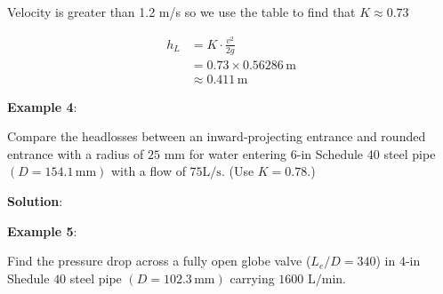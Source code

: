\documentclass[10pt, oneside]{amsart}
\begin{document}
\begin{multicols}{2}
{Velocity is greater than 1.2 m/s so we use the table to find that $K \approx 0.73 $

\begin{align*}
	h_L &= K\cdot\frac{v^2}{2g} \\
	&= 0.73\times 0.56286\,\text{m} \\
	&\approx 0.411\,\text{m}
\end{align*}

}

\vfill
\columnbreak

\textbf{Example 4}:

Compare the headlosses between an inward-projecting entrance and rounded entrance with a radius of $25\text{ mm}$
for water entering $6\text{-in}$ Schedule 40 steel pipe $(D=154.1\,\text{mm})$ with a flow of $75\text{L/s}$. (Use $K=0.78$.)

\textbf{Solution}:



\vfill
\pagebreak

	\textbf{Example 5}:

	Find the pressure drop across a fully open globe valve ($L_e/D=340$) in $4\text{-in}$ Shedule $40$ steel pipe $(D=102.3\,\text{mm})$
	carrying $1600\text{ L/min}$.


\end{multicols}
\end{document}
